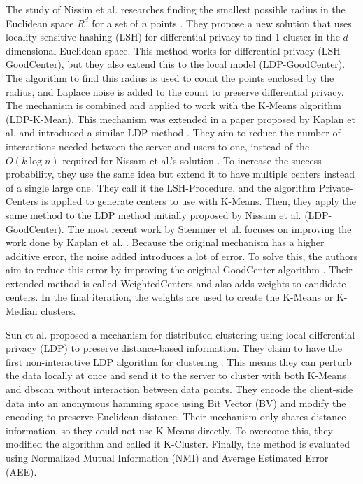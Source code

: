The study of Nissim et al. researches finding the smallest possible radius in the Euclidean space  $R^d$ for a set of $n$ points \citep{nissim_clustering_2018}.
They propose a new solution that uses locality-sensitive hashing (LSH) for differential privacy to find 1-cluster in the $d$-dimensional Euclidean space.
This method works for differential privacy (LSH-GoodCenter), but they also extend this to the local model (LDP-GoodCenter).
The algorithm to find this radius is used to count the points enclosed by the radius, and Laplace noise is added to the count to preserve differential privacy.
The mechanism is combined and applied to work with the K-Means algorithm (LDP-K-Mean).
This mechanism was extended in a paper proposed by Kaplan et al. and introduced a similar LDP method \citep{kaplan_differentially_2018}.
They aim to reduce the number of interactions needed between the server and users to one, instead of the $O(k\log n)$ required for Nissam et al.’s solution \citep{nissim_clustering_2018}.
To increase the success probability, they use the same idea but extend it to have multiple centers instead of a single large one.
They call it the LSH-Procedure, and the algorithm Private-Centers is applied to generate centers to use with K-Means.
Then, they apply the same method to the LDP method initially proposed by Nissam et al. (LDP-GoodCenter).
The most recent work by Stemmer et al. focuses on improving the work done by Kaplan et al. \citep{kaplan_differentially_2018,stemmer_locally_2021}.
Because the original mechanism has a higher additive error, the noise added introduces a lot of error.
To solve this, the authors aim to reduce this error by improving the original GoodCenter algorithm \citep{nissim_clustering_2018}.
Their extended method is called WeightedCenters and also adds weights to candidate centers.
In the final iteration, the weights are used to create the K-Means or K-Median clusters.

Sun et al. proposed a mechanism for distributed clustering using local differential privacy (LDP) to preserve distance-based information.
They claim to have the first non-interactive LDP algorithm for clustering \citep{su_differentially_2015}.
This means they can perturb the data locally at once and send it to the server to cluster with both K-Means and \gls{dbscan} without interaction between data points.
They encode the client-side data into an anonymous hamming space using Bit Vector (BV) and modify the encoding to preserve Euclidean distance.
Their mechanism only shares distance information, so they could not use K-Means directly.
To overcome this, they modified the algorithm and called it K-Cluster.
Finally, the method is evaluated using Normalized Mutual Information (NMI) and Average Estimated Error (AEE).

